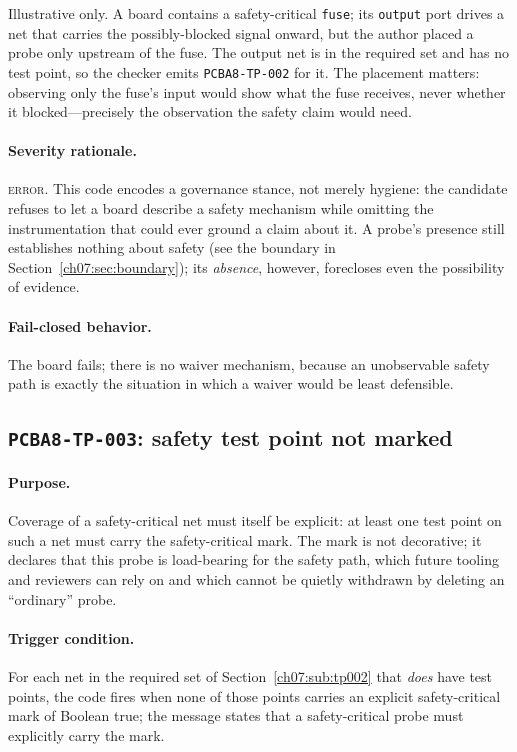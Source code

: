 \begin{example}\label{ch07:ex:tp002}
Illustrative only. A board contains a safety-critical \texttt{fuse}; its \texttt{output} port drives a net that carries the possibly-blocked signal onward, but the author placed a probe only upstream of the fuse. The output net is in the required set and has no test point, so the checker emits \texttt{PCBA8-TP-002} for it. The placement matters: observing only the fuse's input would show what the fuse receives, never whether it blocked---precisely the observation the safety claim would need.
\end{example}

\paragraph{Severity rationale.} \textsc{error}. This code encodes a governance stance, not merely hygiene: the candidate refuses to let a board describe a safety mechanism while omitting the instrumentation that could ever ground a claim about it. A probe's presence still establishes nothing about safety (see the boundary in Section~\ref{ch07:sec:boundary}); its \emph{absence}, however, forecloses even the possibility of evidence.

\paragraph{Fail-closed behavior.} The board fails; there is no waiver mechanism, because an unobservable safety path is exactly the situation in which a waiver would be least defensible.

\subsection{\texttt{PCBA8-TP-003}: safety test point not marked}\label{ch07:sub:tp003}

\paragraph{Purpose.} Coverage of a safety-critical net must itself be explicit: at least one test point on such a net must carry the safety-critical mark. The mark is not decorative; it declares that this probe is load-bearing for the safety path, which future tooling and reviewers can rely on and which cannot be quietly withdrawn by deleting an ``ordinary'' probe.

\paragraph{Trigger condition.} For each net in the required set of Section~\ref{ch07:sub:tp002} that \emph{does} have test points, the code fires when none of those points carries an explicit safety-critical mark of Boolean true; the message states that a safety-critical probe must explicitly carry the mark.

